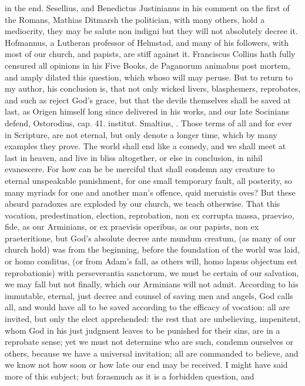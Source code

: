 {in the end. Sesellius, and Benedictus Justinianus in his comment on the
first of the Romans, Mathias Ditmarsh the politician, with many others,
hold a mediocrity, they may be salute non indigni but they will not
absolutely decree it. Hofmannus, a Lutheran professor of Helmstad, and
many of his followers, with most of our church, and papists, are stiff
against it. Franciscus Collius hath fully censured all opinions in his
Five Books, de Paganorum animabus post mortem, and amply dilated this
question, which whoso will may peruse. But to return to my author, his
conclusion is, that not only wicked livers, blasphemers, reprobates,
and such as reject God's grace, but that the devils themselves shall be
saved at last, as Origen himself long since delivered in his
works, and our late Socinians defend, Ostorodius, cap. 41.
institut. Smaltius, \etc{}. Those terms of all and for ever in Scripture,
are not eternal, but only denote a longer time, which by many examples
they prove. The world shall end like a comedy, and we shall meet at
last in heaven, and live in bliss altogether, or else in conclusion, in
nihil evanescere. For how can he be merciful that shall condemn any
creature to eternal unspeakable punishment, for one small temporary
fault, all posterity, so many myriads for one and another man's
offence, quid meruistis oves? But these absurd paradoxes are exploded
by our church, we teach otherwise. That this vocation, predestination,
election, reprobation, non ex corrupta massa, praeviso, fide, as our
Arminians, or ex praevisis operibus, as our papists, non ex
praeteritione, but God's absolute decree ante mundum creatum, (as many
of our church hold) was from the beginning, before the foundation of
the world was laid, or homo conditus, (or from Adam's fall, as others
will, homo lapsus objectum est reprobationis) with perseverantia
sanctorum, we must be certain of our salvation, we may fall but not
finally, which our Arminians will not admit. According to his
immutable, eternal, just decree and counsel of saving men and angels,
God calls all, and would have all to be saved according to the efficacy
of vocation: all are invited, but only the elect apprehended: the rest
that are unbelieving, impenitent, whom God in his just judgment leaves
to be punished for their sins, are in a reprobate sense; yet we must
not determine who are such, condemn ourselves or others, because we
have a universal invitation; all are commanded to believe, and we know
not how soon or how late our end may be received. I might have said
more of this subject; but forasmuch as it is a forbidden question, and
}
